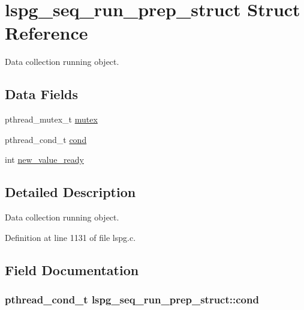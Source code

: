 \hypertarget{structlspg__seq__run__prep__struct}{\section{lspg\-\_\-seq\-\_\-run\-\_\-prep\-\_\-struct Struct Reference}
\label{structlspg__seq__run__prep__struct}
}


Data collection running object.  


\subsection*{Data Fields}
\begin{DoxyCompactItemize}
\item 
pthread\-\_\-mutex\-\_\-t \hyperlink{structlspg__seq__run__prep__struct_ad146cb91b5f7dd8bb283092c28781fe7}{mutex}
\item 
pthread\-\_\-cond\-\_\-t \hyperlink{structlspg__seq__run__prep__struct_acd83ea6994f57377716ff01c8ee7ce43}{cond}
\item 
int \hyperlink{structlspg__seq__run__prep__struct_a42d08888327e9059ddd69ddfec31b8a9}{new\-\_\-value\-\_\-ready}
\end{DoxyCompactItemize}


\subsection{Detailed Description}
Data collection running object. 

Definition at line 1131 of file lspg.\-c.



\subsection{Field Documentation}
\hypertarget{structlspg__seq__run__prep__struct_acd83ea6994f57377716ff01c8ee7ce43}{
\subsubsection[{cond}]{\setlength{\rightskip}{0pt plus 5cm}pthread\-\_\-cond\-\_\-t lspg\-\_\-seq\-\_\-run\-\_\-prep\-\_\-struct\-::cond}}\label{structlspg__seq__run__prep__struct_acd83ea6994f57377716ff01c8ee7ce43}


